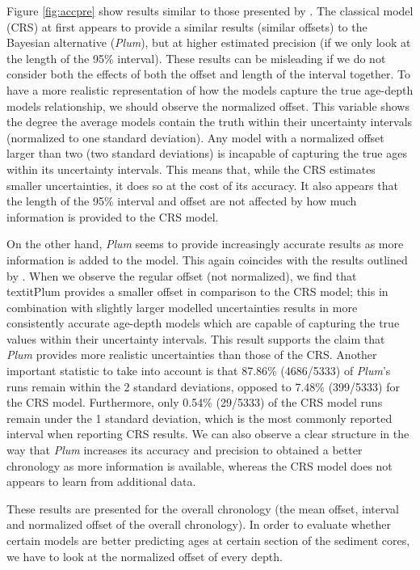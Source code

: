 \documentclass [10pt] {article}
\begin{document}
Figure \ref{fig:accpre} show results similar to those presented by \citet{Blaauw2018}. 
The classical model (CRS) at first appears to provide a similar results (similar offsets) to the Bayesian alternative (\textit{Plum}), but at higher estimated precision (if we only look at the length of the 95\% interval). 
These results can be misleading if we do not consider both the effects of both the offset and length of the interval together. 
To have a more realistic representation of how the models capture the true age-depth models relationship, we should observe the normalized offset. 
This variable shows the degree the average models contain the truth within their uncertainty intervals (normalized to one standard deviation). 
Any model with a normalized offset larger than two (two standard deviations) is incapable of capturing the true ages within its uncertainty intervals.  
This means that, while the CRS estimates smaller uncertainties, it does so at the cost of its accuracy.
It also appears that the length of the 95\% interval and offset are not affected by how much information is provided to the CRS model. 

On the other hand, \textit{Plum} seems to provide increasingly accurate results as more information is added to the model.
This again coincides with the results outlined by \citet{Blaauw2018}. 
When we observe the regular offset (not normalized), we find that textit{Plum} provides a smaller offset in comparison to the CRS model; this in combination with slightly larger modelled uncertainties results in more consistently accurate age-depth models which are capable of capturing the true values within their uncertainty intervals. 
This result supports the claim that \textit{Plum} provides more realistic uncertainties than those of the CRS. 
Another important statistic to take into account is that 87.86\% (4686/5333) of \textit{Plum}'s runs remain within the 2 standard deviations, opposed to 7.48\% (399/5333) for the CRS model. Furthermore, only 0.54\% (29/5333) of the CRS model runs remain under the 1 standard deviation, which is the most commonly reported interval when reporting CRS results.
We can also observe a clear structure in the way that \textit{Plum} increases its accuracy and precision to obtained a better chronology as more information is available, whereas the CRS model does not appears to learn from additional data. 

These results are presented for the overall chronology (the mean offset, interval and normalized offset of the overall chronology). 
In order to evaluate whether certain models are better predicting ages at certain section of the sediment cores, we have to look at the normalized offset of every depth. 
\end{document}
